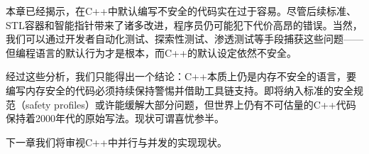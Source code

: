 本章已经揭示，在C++中默认编写不安全的代码实在过于容易。尽管后续标准、STL容器和智能指针带来了诸多改进，程序员仍可能犯下代价高昂的错误。当然，我们可以通过开发者自动化测试、探索性测试、渗透测试等手段捕获这些问题——但编程语言的默认行为才是根本，而C++的默认设定依然不安全。

经过这些分析，我们只能得出一个结论：C++本质上仍是内存不安全的语言，要编写内存安全的代码必须持续保持警惕并借助工具链支持。即将纳入标准的安全规范（safety profiles）或许能缓解大部分问题，但世界上仍有不可估量的C++代码保持着2000年代的原始写法。现状可谓喜忧参半。

下一章我们将审视C++中并行与并发的实现现状。
